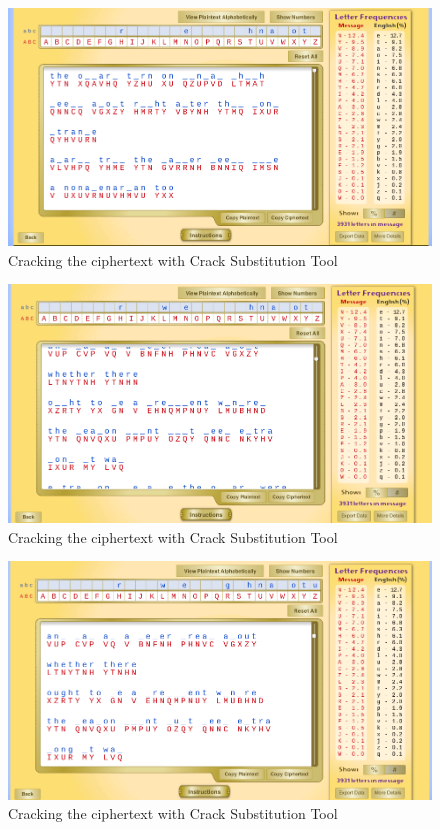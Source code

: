 \documentclass[12pt]{article}
\begin{document}
\begin{figure}[!ht]
    \begin{center}
        \includegraphics[scale=0.48]{c6.png}
    \end{center}{}
    \caption{Cracking the ciphertext with Crack Substitution Tool}
    \label{fig:c6}
\end{figure}


\begin{figure}[!ht]
    \begin{center}
        \includegraphics[scale=0.48]{c7.png}
    \end{center}{}
    \caption{Cracking the ciphertext with Crack Substitution Tool}
    \label{fig:c7}
\end{figure}

\begin{figure}[!ht]
    \begin{center}
        \includegraphics[scale=0.48]{c8.png}
    \end{center}{}
    \caption{Cracking the ciphertext with Crack Substitution Tool}
    \label{fig:c8}
\end{figure}
\end{document}
